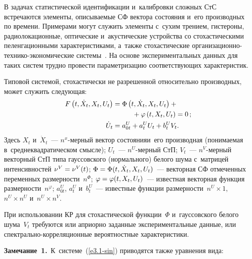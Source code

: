 \begin{multicols}{2}
В задачах статистической идентификации и~калибровки сложных 
СтС встречаются элементы, описываемые СФ вектора 
состояния и~его производных по времени. Примерами могут служить 
элементы с~сухим трением, гистероны, радиолокационные, оптические и~акустические 
устройства со стохастическими пеленгационными характеристиками, а~также
 стохастические ор\-га\-ни\-за\-ци\-он\-но-тех\-ни\-ко-эко\-но\-ми\-че\-ские сис\-те\-мы~\cite{10-sin}. 
 На основе экспериментальных данных для таких сис\-тем труд\-но провести 
 па\-ра\-мет\-ри\-за\-цию соответствующих характеристик.

Типовой системой, стохастически не разрешенной относительно производных, может служить сле\-ду\-ющая:
 \begin{align}
    F\left(t, \dot X_t, X_t, U_t\right) &= \Phi\left(t, \dot X_t, X_t, U_t\right) +{}\notag\\
    &\hspace*{10mm}{}+     \varphi \left(t, X_t, U_t\right)=0\,;
    \label{e3.1-sin}
    \\
    \dot U_t &= a_{0t}^U+ a_t^UU_t+b_t^UV_t.
    \label{e3.2-sin}
\end{align}
Здесь  $X_t$ и~$\dot X_t$~--- $n^x$-мер\-ный вектор со\-сто\-яния\linebreak и~его производная 
(понимаемая в~сред\-не\-квад\-ра\-ти\-че\-ском смыс\-ле); $U_t$~--- $n^U$-мер\-ный СтП; 
$V_t$~---  $n^V$-мер\-ный векторный СтП типа гауссовского (\mbox{нормального}) белого шума 
с~мат\-ри\-цей \mbox{интенсивностей}  $\nu^V\hm=\nu^V(t)$; $\Phi \hm=\Phi(t, \dot X_t, X_t, U_t)$~--- 
векторная СФ отмеченных переменных раз\-мер\-ности~$n^\Phi$; $\varphi \hm=\varphi(t, X_t, U_t)$~--- 
известная векторная функция раз\-мер\-ности~$n^\varphi$; $a_{0t}^U$, $a_t^U$ и~$b_t^U$~--- 
известные функции раз\-мер\-ности~$n^U\times 1$, $n^U\times n^U$ и~$n^U \times n^V$.

При использовании КР для стохастической функции~$\Phi$ и~гауссовского белого шума~$V_t$ 
требуются или априорно заданные экспериментальные данные, или спект\-раль\-но-кор\-ре\-ля\-ци\-он\-ные 
вероятностные характеристики.

\smallskip

\noindent
\textbf{Замечание~1.}\ К~сис\-те\-ме~(\ref{e3.1-sin}) приводятся также уравнения вида:


\end{multicols}

